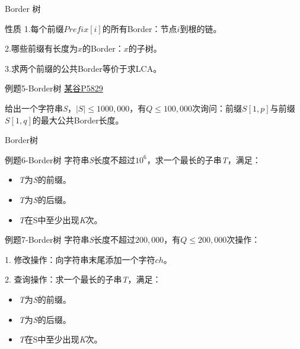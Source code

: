 \documentclass{ctexbeamer}		%
\begin{document}
\begin{frame}{Border 树}
\begin{block}{性质}
1.每个前缀$Prefix[i]$的所有Border：节点$i$到根的链。

2.哪些前缀有长度为$x$的Border：$x$的子树。

3.求两个前缀的公共Border等价于求LCA。

\end{block}

\pause

\begin{block}{例题5-Border树 \href{https://www.luogu.com.cn/problem/P5829}{某谷P5829}}

给出一个字符串\textit{S}，$|S| \leq 1000, 000$，有$Q \leq 100, 000$次询问：前缀$S[1,p]$与前缀$S[1,q]$的最大公共Border长度。

\end{block}
\end{frame}
\begin{frame}{Border树}
\begin{block}{例题6-Border树}
字符串\textit{S}长度不超过$10^6$，求一个最长的子串\textit{T}，满足：

\begin{itemize}
    \item \textit{T}为\textit{S}的前缀。
    \item \textit{T}为\textit{S}的后缀。
    \item \textit{T}在S中至少出现\color{red}\textit{K}\color{black}次。
\end{itemize}

\end{block}

\pause

\begin{block}{例题7-Border树}
字符串\textit{S}长度不超过$200,000$，有$Q \leq 200, 000$次操作：

1. 修改操作：向字符串末尾添加一个字符$ch$。

2. 查询操作：求一个最长的子串\textit{T}，满足：

\begin{itemize}
    \item \textit{T}为\textit{S}的前缀。
    \item \textit{T}为\textit{S}的后缀。
    \item \textit{T}在S中至少出现\color{red}\textit{K}\color{black}次。
\end{itemize}

\end{block}
    
\end{frame}
\end{document}
